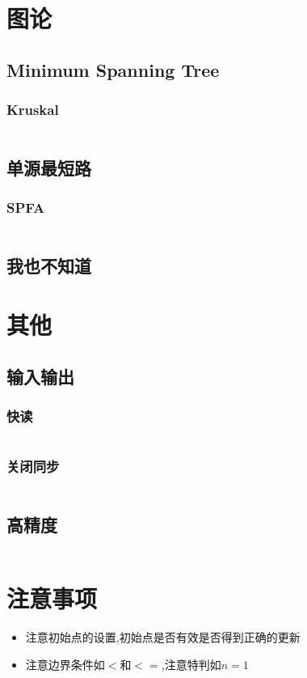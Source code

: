 \documentclass[a4paper,11pt]{article}
\begin{document}
\newpage
\section{图论} %
\subsection{Minimum Spanning Tree} %
\subsubsection{Kruskal} %
\inputminted[breaklines]{c++}{graph/kruskal.cc} %
\subsection{单源最短路}
\subsubsection{SPFA}
\inputminted[breaklines]{c++}{graph/spfa.cc}
\subsection{我也不知道}

\section{其他}
\subsection{输入输出}
\subsubsection{快读}
\inputminted[breaklines,linenos,frame=leftline]{c++}{others/read1.cpp}
\subsubsection{关闭同步}
\inputminted[breaklines,linenos,frame=leftline]{c++}{others/read2.cpp}
\subsection{高精度}
\inputminted[breaklines,linenos,frame=leftline]{c++}{others/bignum1.cpp}


\newpage
\section{注意事项}
\begin{itemize}
    \item 注意初始点的设置,初始点是否有效是否得到正确的更新
    \item 注意边界条件如$<$和$<=$,注意特判如$n=1$
\end{itemize}
\end{document}
